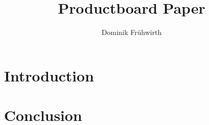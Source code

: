 \documentclass{ieeetran}
\title{Productboard Paper}
\author{Dominik Frühwirth}
\begin{document}
\maketitle

\begin{abstract}
\end{abstract}

\begin{keywords}
\end{keywords}

\section{Introduction}

\section{Conclusion}
\end{document}
